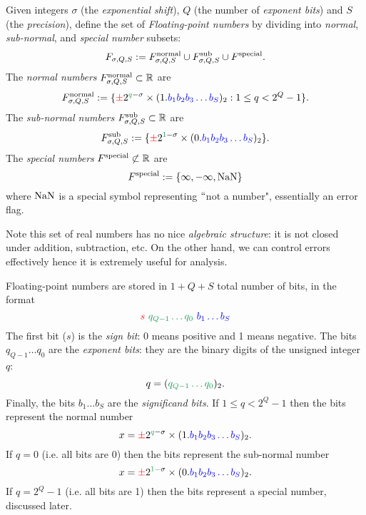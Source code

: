\begin{definition} Given integers $\ensuremath{\sigma}$ (the \emph{exponential shift}), $Q$ (the number of \emph{exponent bits}) and  $S$ (the \emph{precision}), define the set of \emph{Floating-point numbers} by dividing into \emph{normal}, \emph{sub-normal}, and \emph{special number} subsets:
\[
F_{\ensuremath{\sigma},Q,S} := F^{\rm normal}_{\ensuremath{\sigma},Q,S} \cup F^{\rm sub}_{\ensuremath{\sigma},Q,S} \cup F^{\rm special}.
\]
The \emph{normal numbers} $F^{\rm normal}_{\sigma,Q,S} \subset {\mathbb R}$ are
\[
F^{\rm normal}_{\ensuremath{\sigma},Q,S} := \{\red{\ensuremath{\pm}} 2^{\green{q}-\ensuremath{\sigma}} \ensuremath{\times} (1.\blue{b_1b_2b_3\ensuremath{\ldots}b_S})_2 : 1 \ensuremath{\leq} q < 2^Q-1 \}.
\]
The \emph{sub-normal numbers} $F^{\rm sub}_{\sigma,Q,S} \subset {\mathbb R}$ are
\[
F^{\rm sub}_{\ensuremath{\sigma},Q,S} := \{\red{\ensuremath{\pm}} 2^{\green{1}-\ensuremath{\sigma}} \ensuremath{\times} (0.\blue{b_1b_2b_3\ensuremath{\ldots}b_S})_2\}.
\]
The \emph{special numbers} $F^{\rm special} \not\subset {\mathbb R}$ are 
\[
F^{\rm special} :=  \{\ensuremath{\infty}, -\ensuremath{\infty}, {\rm NaN}\}
\]
where ${\rm NaN}$ is a special symbol representing \ensuremath{\ldq}not a number", essentially an error flag. \end{definition}

Note this set of real numbers has no nice \emph{algebraic structure}: it is not closed under addition, subtraction, etc. On the other hand, we can control errors effectively hence it is extremely useful for analysis.

Floating-point numbers are stored in $1 + Q + S$ total number of bits, in the format
\[
\red{s}\ \green{q_{Q-1}\ensuremath{\ldots}q_0}\ \blue{b_1\ensuremath{\ldots}b_S}
\]
The first bit ($s$) is the \emph{sign bit}: 0 means positive and 1 means negative. The bits $q_{Q-1}\ensuremath{\ldots}q_0$ are the \emph{exponent bits}: they are the binary digits of the unsigned integer $q$: 
\[
q = (\green{q_{Q-1}\ensuremath{\ldots}q_0})_2.
\]
Finally, the bits $b_1\ensuremath{\ldots}b_S$ are the \emph{significand bits}. If $1 \ensuremath{\leq} q < 2^Q-1$ then the bits represent the normal number
\[
x = \red{\ensuremath{\pm}} 2^{\green{q}-\ensuremath{\sigma}} \ensuremath{\times} (1.\blue{b_1b_2b_3\ensuremath{\ldots}b_S})_2.
\]
If $q = 0$ (i.e. all bits are 0) then the bits represent the sub-normal number
\[
x = \red{\ensuremath{\pm}} 2^{\green{1}-\ensuremath{\sigma}} \ensuremath{\times} (0.\blue{b_1b_2b_3\ensuremath{\ldots}b_S})_2.
\]
If $q = 2^Q-1$  (i.e. all bits are 1) then the bits represent a special number, discussed later.

